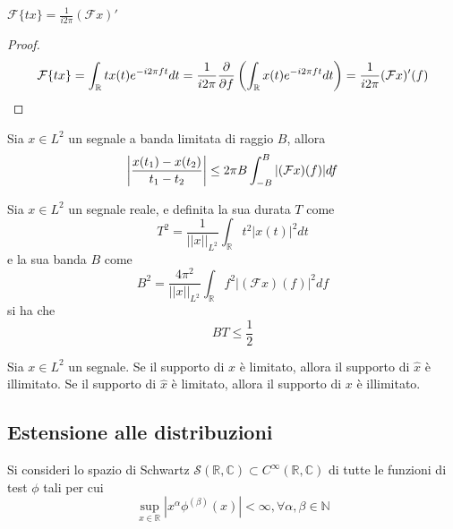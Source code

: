         \begin{property}
            $\mathcal{F}\{tx\} = \frac{1}{i 2 \pi} (\mathcal{F}x)'$
        \end{property}
        \begin{proof}
            \[
                \mathcal{F}\{tx\} =
                \int_{\mathbb{R}} t x(t) e^{-i 2 \pi f t} dt =
                \frac{1}{i 2 \pi} \frac{\partial}{\partial f} \qty( \int_{\mathbb{R}} x(t) e^{-i 2 \pi f t} dt ) = 
                \frac{1}{i 2 \pi} (\mathcal{F} x)'(f)
            \]
        \end{proof}

        \begin{property}
            Sia $x \in L^2$ un segnale a banda limitata di raggio $B$, allora
            \[
                \qty| \frac{x(t_1) - x(t_2)}{t_1 - t_2} | \leq 2 \pi B \int_{-B}^{B} |(\mathcal{F} x)(f)| df
            \]
        \end{property}

        \begin{property}
            Sia $x \in L^2$ un segnale reale, e definita la sua durata $T$ come
            \[
                T^2 = \frac{1}{||x||_{L^2}} \int_{\mathbb{R}} t^2 |x(t)|^2 dt
            \]
            e la sua banda $B$ come
            \[
                B^2 = \frac{4 \pi^2}{||x||_{L^2}} \int_{\mathbb{R}} f^2 |(\mathcal{F}x)(f)|^2 df
            \]
            si ha che
            \[
                BT \leq \frac{1}{2}
            \]
        \end{property}

        \begin{property}
            Sia $x \in L^2$ un segnale.
            Se il supporto di $x$ è limitato, allora il supporto di $\hat{x}$ è illimitato.
            Se il supporto di $\hat{x}$ è limitato, allora il supporto di $x$ è illimitato.
        \end{property}

    \subsection{Estensione alle distribuzioni}
        Si consideri lo spazio di Schwartz $\mathcal{S}(\mathbb{R}, \mathbb{C}) \subset C^{\infty}(\mathbb{R}, \mathbb{C})$ di tutte le funzioni di test $\phi$ tali per cui
        \[
            \sup_{x \in \mathbb{R}} |x^{\alpha} \phi^{(\beta)}(x)| < \infty, \forall \alpha, \beta \in \mathbb{N}
        \]

